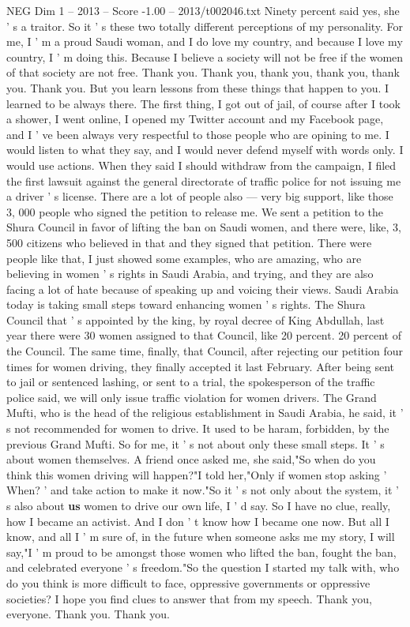 \begin{textsample}{NEG Dim 1 – 2013 – Score -1.00 – 2013/t002046.txt}
Ninety percent said yes, she ' s a traitor.
So it ' s these two totally different perceptions of my personality.
For me, I ' m a proud Saudi woman, and I do love my country, and because I love my country, I ' m doing this.
Because I believe a society will not be free if the women of that society are not free.
Thank you.
Thank you, thank you, thank you, thank you.
Thank you.
But you learn lessons from these things that happen to you.
I learned to be always there.
The first thing, I got out of jail, of course after I took a shower, I went online, I opened my Twitter account and my Facebook page, and I ' ve been always very respectful to those people who are opining to me.
I would listen to what they say, and I would never defend myself with words only.
I would use actions.
When they said I should withdraw from the campaign, I filed the first lawsuit against the general directorate of traffic police for not issuing me a driver ' s license.
There are a lot of people also — very big support, like those 3, 000 people who signed the petition to release me.
We sent a petition to the Shura Council in favor of lifting the ban on Saudi women, and there were, like, 3, 500 citizens who believed in that and they signed that petition.
There were people like that, I just showed some examples, who are amazing, who are believing in women ' s rights in Saudi Arabia, and trying, and they are also facing a lot of hate because of speaking up and voicing their views.
Saudi Arabia today is taking small steps toward enhancing women ' s rights.
The Shura Council that ' s appointed by the king, by royal decree of King Abdullah, last year there were 30 women assigned to that Council, like 20 percent. 20 percent of the Council.
The same time, finally, that Council, after rejecting our petition four times for women driving, they finally accepted it last February.
After being sent to jail or sentenced lashing, or sent to a trial, the spokesperson of the traffic police said, we will only issue traffic violation for women drivers.
The Grand Mufti, who is the head of the religious establishment in Saudi Arabia, he said, it ' s not recommended for women to drive.
It used to be haram, forbidden, by the previous Grand Mufti.
So for me, it ' s not about only these small steps.
It ' s about women themselves.
A friend once asked me, she said,"So when do you think this women driving will happen?"I told her,"Only if women stop asking ' When? ' and take action to make it now."So it ' s not only about the system, it ' s also about \textbf{us} women to drive our own life, I ' d say.
So I have no clue, really, how I became an activist.
And I don ' t know how I became one now.
But all I know, and all I ' m sure of, in the future when someone asks me my story, I will say,"I ' m proud to be amongst those women who lifted the ban, fought the ban, and celebrated everyone ' s freedom."So the question I started my talk with, who do you think is more difficult to face, oppressive governments or oppressive societies?
I hope you find clues to answer that from my speech.
Thank you, everyone.
Thank you.
Thank you.

\end{textsample}

